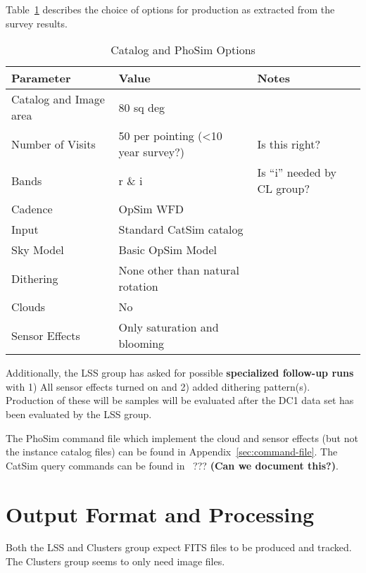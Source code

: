 \documentclass[12pt,letterpaper]{article}
\begin{document}
Table~\ref{tab:phosim-options} describes the choice of options for
production as extracted from the survey results.

\begin{table}[!htb]
  \begin{tabular}{| l| l| p{3cm} | }
    \hline 
    Parameter                       & Value   & Notes  \\
    \hline
    Catalog and Image area  & 80 sq deg & \\
    Number of Visits            & 50 per pointing (\textless 10 year survey?) &  Is this right? \\
    Bands                             & r \& i   &    Is ``i'' needed by CL group? \\
    Cadence                         & OpSim WFD  & \\
    Input                              & Standard CatSim catalog & \\
    Sky Model                      & Basic OpSim Model & \\
    Dithering                       & None other than natural rotation   & \\
    Clouds                           & No & \\
    Sensor Effects                & Only saturation and blooming& \\
    \hline
  \end{tabular}
  \caption{Catalog and PhoSim Options}
  \label{tab:phosim-options}
\end{table}

Additionally, the LSS group has asked for possible {\bf specialized
follow-up runs} with 1) All sensor effects turned on and 2) added
dithering pattern(s).  Production of these will be samples will be
evaluated after the DC1 data set has been evaluated by the LSS group.

The PhoSim command file which implement the cloud and sensor effects (but not the
instance catalog files) can be found in Appendix~\ref{sec:command-file}.  The
CatSim query commands can be found in~ ??? {\bf (Can we document this?)}.

\section{Output Format and Processing}

Both the LSS and Clusters group expect FITS files to be produced and
tracked.  The Clusters group seems to only need image files.  \\
\end{document}
